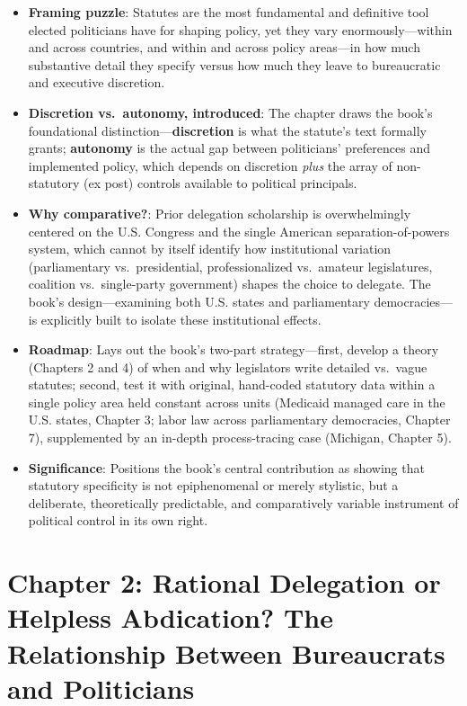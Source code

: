 \documentclass[12pt]{article}
\begin{document}
\begin{itemize}[leftmargin=*, itemsep=4pt]
    \item \textbf{Framing puzzle}: Statutes are the most fundamental and definitive tool elected politicians have for shaping policy, yet they vary enormously---within and across countries, and within and across policy areas---in how much substantive detail they specify versus how much they leave to bureaucratic and executive discretion.
    \item \textbf{Discretion vs.\ autonomy, introduced}: The chapter draws the book's foundational distinction---\textbf{discretion} is what the statute's text formally grants; \textbf{autonomy} is the actual gap between politicians' preferences and implemented policy, which depends on discretion \emph{plus} the array of non-statutory (ex post) controls available to political principals.
    \item \textbf{Why comparative?}: Prior delegation scholarship is overwhelmingly centered on the U.S. Congress and the single American separation-of-powers system, which cannot by itself identify how institutional variation (parliamentary vs.\ presidential, professionalized vs.\ amateur legislatures, coalition vs.\ single-party government) shapes the choice to delegate. The book's design---examining both U.S. states and parliamentary democracies---is explicitly built to isolate these institutional effects.
    \item \textbf{Roadmap}: Lays out the book's two-part strategy---first, develop a theory (Chapters 2 and 4) of when and why legislators write detailed vs.\ vague statutes; second, test it with original, hand-coded statutory data within a single policy area held constant across units (Medicaid managed care in the U.S. states, Chapter 3; labor law across parliamentary democracies, Chapter 7), supplemented by an in-depth process-tracing case (Michigan, Chapter 5).
    \item \textbf{Significance}: Positions the book's central contribution as showing that statutory specificity is not epiphenomenal or merely stylistic, but a deliberate, theoretically predictable, and comparatively variable instrument of political control in its own right.
\end{itemize}

\section{Chapter 2: Rational Delegation or Helpless Abdication? The Relationship Between Bureaucrats and Politicians}
\end{document}
